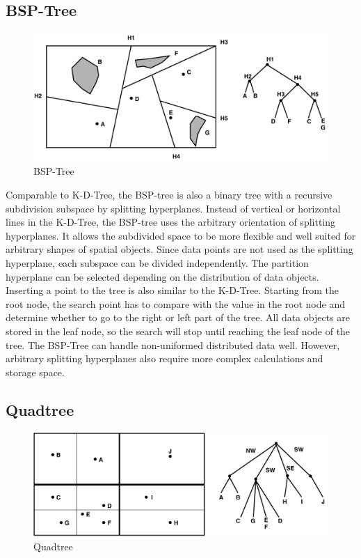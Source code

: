 \subsection{BSP-Tree}

\begin{figure}[ht]
\centering
\includegraphics[scale=0.75]{Figures/bsptree.pdf}
\caption{BSP-Tree}
\label{fig:bsptree}
\end{figure}

Comparable to K-D-Tree, the BSP-tree \cite{Fuchs:1980bj} is also a binary tree with a recursive subdivision subspace by splitting hyperplanes. Instead of vertical or horizontal lines in the K-D-Tree, the BSP-tree uses the arbitrary orientation of splitting hyperplanes. It allows the subdivided space to be more flexible and well suited for arbitrary shapes of spatial objects. Since data points are not used as the splitting hyperplane, each subspace can be divided independently. The partition hyperplane can be selected depending on the distribution of data objects. 
Inserting a point to the tree is also similar to the K-D-Tree. Starting from the root node, the search point has to compare with the value in the root node and determine whether to go to the right or left part of the tree. All data objects are stored in the leaf node, so the search will stop until reaching the leaf node of the tree. 
The BSP-Tree can handle non-uniformed distributed data well. However, arbitrary splitting hyperplanes also require more complex calculations and storage space. 



\subsection{Quadtree}

\begin{figure}[ht]
\centering
\includegraphics[scale=0.75]{Figures/quadtree.pdf}
\caption{Quadtree}
\label{fig:bsptree}
\end{figure}

